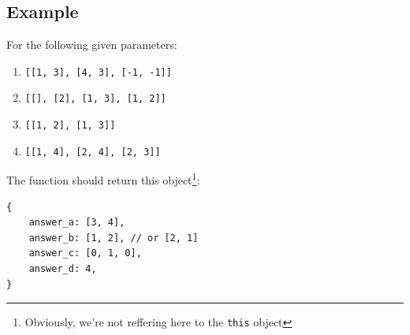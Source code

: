 \documentclass{article}
\begin{document}
\subsection*{Example}
For the following given parameters:
\begin{enumerate}
	\item \verb|[[1, 3], [4, 3], [-1, -1]]|
	\item \verb|[[], [2], [1, 3], [1, 2]]|
	\item \verb|[[1, 2], [1, 3]]|
	\item \verb|[[1, 4], [2, 4], [2, 3]]|
\end{enumerate}

The function should return this object\footnote{Obviously, we're not reffering here to the \texttt{this} object}:
\begin{verbatim}
{
    answer_a: [3, 4],
    answer_b: [1, 2], // or [2, 1]
    answer_c: [0, 1, 0],
    answer_d: 4,
}
\end{verbatim}
\end{document}
